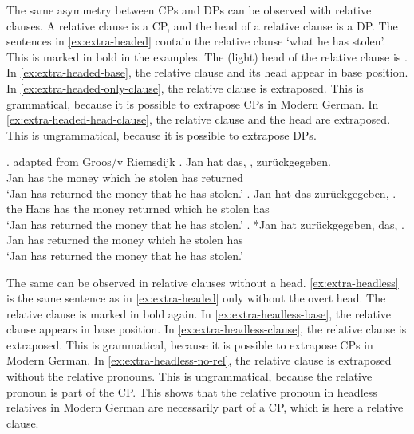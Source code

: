 The same asymmetry between CPs and DPs can be observed with relative clauses. A relative clause is a CP, and the head of a relative clause is a DP. The sentences in \ref{ex:extra-headed} contain the relative clause  `what he has stolen'. This is marked in bold in the examples. The (light) head of the relative clause is .
In \ref{ex:extra-headed-base}, the relative clause and its head appear in base position. In \ref{ex:extra-headed-only-clause}, the relative clause is extraposed. This is grammatical, because it is possible to extrapose CPs in Modern German. In \ref{ex:extra-headed-head-clause}, the relative clause and the head are extraposed. This is ungrammatical, because it is possible to extrapose DPs.

\ex. \label{ex:extra-headed} adapted from Groos/v Riemsdijk
\ag. Jan hat das,    , zurückgegeben.\\
Jan has the money which he stolen has returned\\
\glt `Jan has returned the money that he has stolen.'\label{ex:extra-headed-base}
\bg. Jan hat das zurückgegeben,    .\\
the Hans has the money returned which he stolen has\\
\glt `Jan has returned the money that he has stolen.'\label{ex:extra-headed-only-clause}
\cg. *Jan hat zurückgegeben, das,    .\\
Jan has returned the money which he stolen has\\
\glt `Jan has returned the money that he has stolen.'\label{ex:extra-headed-head-clause}

The same can be observed in relative clauses without a head. \ref{ex:extra-headless} is the same sentence as in \ref{ex:extra-headed} only without the overt head. The relative clause is marked in bold again.
In \ref{ex:extra-headless-base}, the relative clause appears in base position. In \ref{ex:extra-headless-clause}, the relative clause is extraposed. This is grammatical, because it is possible to extrapose CPs in Modern German. In \ref{ex:extra-headless-no-rel}, the relative clause is extraposed without the relative pronouns. This is ungrammatical, because the relative pronoun is part of the CP.
This shows that the relative pronoun in headless relatives in Modern German are necessarily part of a CP, which is here a relative clause.

